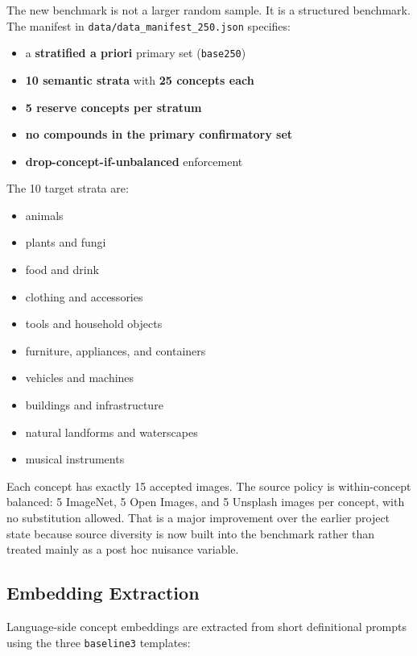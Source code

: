 \documentclass[11pt,a4paper]{article}
\providecommand{\tightlist}{%
  \setlength{\itemsep}{0pt}\setlength{\parskip}{0pt}}
\begin{document}
The new benchmark is not a larger random sample. It is a structured
benchmark. The manifest in \texttt{data/data\_manifest\_250.json}
specifies:

\begin{itemize}
\tightlist
\item
  a \textbf{stratified a priori} primary set (\texttt{base250})
\item
  \textbf{10 semantic strata} with \textbf{25 concepts each}
\item
  \textbf{5 reserve concepts per stratum}
\item
  \textbf{no compounds in the primary confirmatory set}
\item
  \textbf{drop-concept-if-unbalanced} enforcement
\end{itemize}

The 10 target strata are:

\begin{itemize}
\tightlist
\item
  animals
\item
  plants and fungi
\item
  food and drink
\item
  clothing and accessories
\item
  tools and household objects
\item
  furniture, appliances, and containers
\item
  vehicles and machines
\item
  buildings and infrastructure
\item
  natural landforms and waterscapes
\item
  musical instruments
\end{itemize}

Each concept has exactly 15 accepted images. The source policy is
within-concept balanced: 5 ImageNet, 5 Open Images, and 5 Unsplash
images per concept, with no substitution allowed. That is a major
improvement over the earlier project state because source diversity is
now built into the benchmark rather than treated mainly as a post hoc
nuisance variable.

\subsection{Embedding Extraction}\label{embedding-extraction}

Language-side concept embeddings are extracted from short definitional
prompts using the three \texttt{baseline3} templates:
\end{document}
